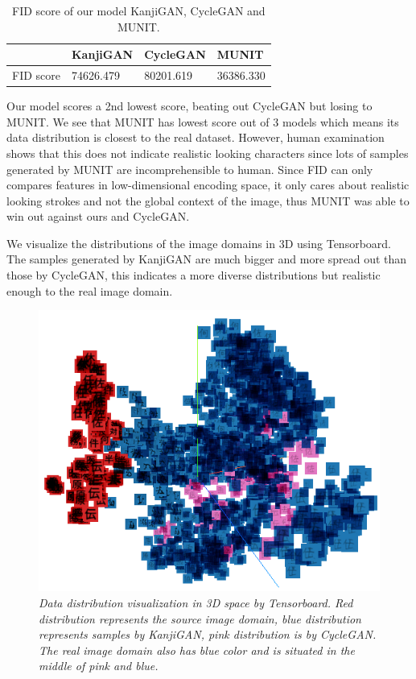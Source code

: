 \documentclass[12pt]{report}
\begin{document}
\begin{table}[h]
	\centering
	\caption{FID score of our model KanjiGAN, CycleGAN and MUNIT.}
	\label{tbl:fid}
	\begin{tabular}{|l|l|l|l|}
		\hline
		\textbf{} & \textbf{KanjiGAN} & \textbf{CycleGAN} & \textbf{MUNIT}       \\ \hline
		FID score	&74626.479               & 80201.619        & 36386.330              \\ \hline
	\end{tabular}
\end{table}

Our model scores a 2nd lowest score, beating out CycleGAN but losing to MUNIT. We see that MUNIT has lowest score out of 3 models which means its data distribution is closest to the real dataset. However, human examination shows that this does not indicate realistic looking characters since lots of samples generated by MUNIT are incomprehensible to human. Since FID can only compares features in low-dimensional encoding space, it only cares about realistic looking strokes and not the global context of the image, thus MUNIT was able to win out against ours and CycleGAN.

We visualize the distributions of the image domains in 3D using Tensorboard. The samples generated by KanjiGAN are much bigger and more spread out than those by CycleGAN, this indicates a more diverse distributions but realistic enough to the real image domain.

\begin{figure}[h]
	\centering
	\includegraphics[scale=1]{data-distribution-2}
	\caption{\textit{Data distribution visualization in 3D space by Tensorboard. Red distribution represents the source image domain, blue distribution represents samples by KanjiGAN, pink distribution is by CycleGAN. The real image domain also has blue color and is situated in the middle of pink and blue.}}
	\label{fig:data-distribution-2}
\end{figure}
\end{document}
